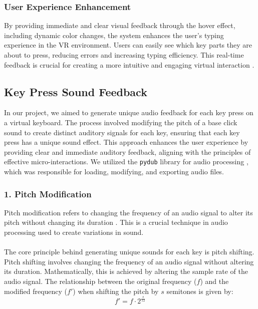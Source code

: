 \subsubsection{User Experience Enhancement}

By providing immediate and clear visual feedback through the hover effect, including dynamic color changes, the system enhances the user's typing experience in the VR environment. Users can easily see which key parts they are about to press, reducing errors and increasing typing efficiency. This real-time feedback is crucial for creating a more intuitive and engaging virtual interaction \cite{norman2013design}.

\subsection{Key Press Sound Feedback} 

In our project, we aimed to generate unique audio feedback for each key press on a virtual keyboard. The process involved modifying the pitch of a base click sound to create distinct auditory signals for each key, ensuring that each key press has a unique sound effect. This approach enhances the user experience by providing clear and immediate auditory feedback, aligning with the principles of effective micro-interactions. We utilized the \texttt{pydub} library for audio processing \cite{pydub}, which was responsible for loading, modifying, and exporting audio files.

\subsubsection*{1. Pitch Modification}

Pitch modification refers to changing the frequency of an audio signal to alter its pitch without changing its duration \cite{smith1999}. This is a crucial technique in audio processing used to create variations in sound.\\ \\
\noindent
The core principle behind generating unique sounds for each key is pitch shifting. Pitch shifting involves changing the frequency of an audio signal without altering its duration. Mathematically, this is achieved by altering the sample rate of the audio signal.
The relationship between the original frequency (\( f \)) and the modified frequency (\( f' \)) when shifting the pitch by \( s \) semitones is given by:
\begin{equation}
f' = f \cdot 2^{\frac{s}{12}}
\end{equation}


